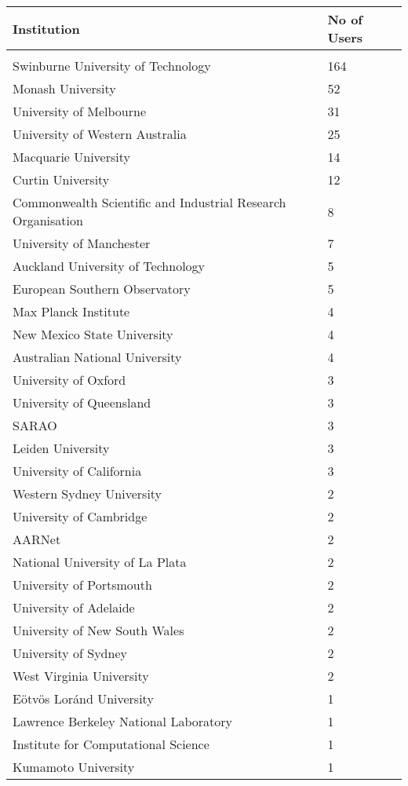 \documentclass{article}%
\begin{document}
%
\begin{longtabu}{X[l] X[r]}%
\textbf{Institution}&\textbf{No of Users}\\%
\hline%
&\\%
Swinburne University of Technology&164\\%
\hline%
Monash University&52\\%
\hline%
University of Melbourne&31\\%
\hline%
University of Western Australia&25\\%
\hline%
Macquarie University&14\\%
\hline%
Curtin University&12\\%
\hline%
Commonwealth Scientific and Industrial Research Organisation&8\\%
\hline%
University of Manchester&7\\%
\hline%
Auckland University of Technology&5\\%
\hline%
European Southern Observatory&5\\%
\hline%
Max Planck Institute&4\\%
\hline%
New Mexico State University&4\\%
\hline%
Australian National University&4\\%
\hline%
University of Oxford&3\\%
\hline%
University of Queensland&3\\%
\hline%
SARAO&3\\%
\hline%
Leiden University&3\\%
\hline%
University of California&3\\%
\hline%
Western Sydney University&2\\%
\hline%
University of Cambridge&2\\%
\hline%
AARNet&2\\%
\hline%
National University of La Plata&2\\%
\hline%
University of Portsmouth&2\\%
\hline%
University of Adelaide&2\\%
\hline%
University of New South Wales&2\\%
\hline%
University of Sydney&2\\%
\hline%
West Virginia University&2\\%
\hline%
Eötvös Loránd University&1\\%
\hline%
Lawrence Berkeley National Laboratory&1\\%
\hline%
Institute for Computational Science&1\\%
\hline%
Kumamoto University&1\\%

\end{longtabu}
\end{document}
